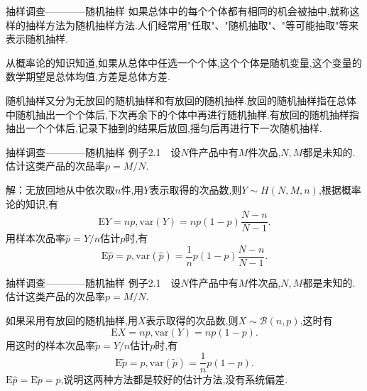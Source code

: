 \begin{frame}{抽样调查————随机抽样}
如果总体中的每个个体都有相同的机会被抽中,就称这样的抽样方法为\alert{随机抽样}方法.人们经常用"\alert{任取}"、"\alert{随机抽取}"、"\alert{等可能抽取}"等来表示随机抽样.

从概率论的知识知道,如果从总体中任选一个个体,这个个体是随机变量,这个变量的数学期望是总体均值,方差是总体方差.

随机抽样又分为无放回的随机抽样和有放回的随机抽样.放回的随机抽样指在总体中随机抽出一个个体后,下次再余下的个体中再进行随机抽样.有放回的随机抽样指抽出一个个体后,记录下抽到的结果后放回,摇匀后再进行下一次随机抽样.
\end{frame}

\begin{frame}{抽样调查————随机抽样}
例子2.1$\quad$设$N$件产品中有$M$件次品,$N,M$都是未知的.估计这类产品的次品率$p=M/N$.

解：无放回地从中依次取$n$件,用$Y$表示取得的次品数,则$Y\sim H(N,M,n)$,根据概率论的知识,有
\begin{equation}
\mathrm{E}Y = np,\mathrm{var}(Y) = np(1-p)\frac{N-n}{N-1}.
\end{equation}
用样本次品率$\hat{p}=Y/n$估计$p$时,有
\begin{equation}
\mathrm{E}\hat{p} = p,\mathrm{var}(\hat{p}) = \frac{1}{n}p(1-p)\frac{N-n}{N-1}.
\end{equation}	
\end{frame}

\begin{frame}{抽样调查————随机抽样}
例子2.1$\quad$设$N$件产品中有$M$件次品,$N,M$都是未知的.估计这类产品的次品率$p=M/N$.

如果采用有放回的随机抽样,用$X$表示取得的次品数,则$X\sim\mathcal{B}(n,p)$,这时有
\begin{equation}
\mathrm{E}X = np,\mathrm{var}(Y) = np(1-p).
\end{equation}
用这时的样本次品率$\tilde{p}=Y/n$估计$p$时,有
\begin{equation}
\mathrm{E}\tilde{p} = p,\mathrm{var}(\tilde{p}) = \frac{1}{n}p(1-p).
\end{equation}	
$\mathrm{E}\hat{p} = \mathrm{E}\tilde{p} = p$,说明这两种方法都是较好的估计方法,没有系统偏差.
\end{frame}

